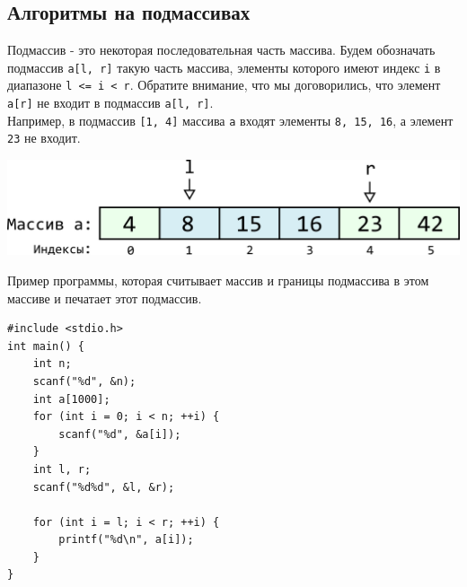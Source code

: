 \documentclass{article}
\begin{document}
\newpage
\subsection*{Алгоритмы на подмассивах}
Подмассив - это некоторая последовательная часть массива. Будем обозначать подмассив \texttt{a[l, r]} такую часть массива, элементы которого имеют индекс \texttt{i} в диапазоне \texttt{l <= i < r}. Обратите внимание, что мы договорились, что элемент \texttt{a[r]} не входит в подмассив \texttt{a[l, r]}.\\

Например, в подмассив \texttt{[1, 4]} массива \texttt{a} входят элементы \texttt{8, 15, 16}, а элемент \texttt{23} не входит.
\begin{center}
\includegraphics[scale=1]{../images/array_slice.png}
\end{center}

Пример программы, которая считывает массив и границы подмассива в этом массиве и печатает этот подмассив.
\begin{lstlisting}
#include <stdio.h>
int main() {
    int n;
    scanf("%d", &n);
    int a[1000];
    for (int i = 0; i < n; ++i) {
        scanf("%d", &a[i]);
    }
    int l, r;
    scanf("%d%d", &l, &r);

    for (int i = l; i < r; ++i) {
        printf("%d\n", a[i]); 
    }
}
\end{lstlisting}
\end{document}
